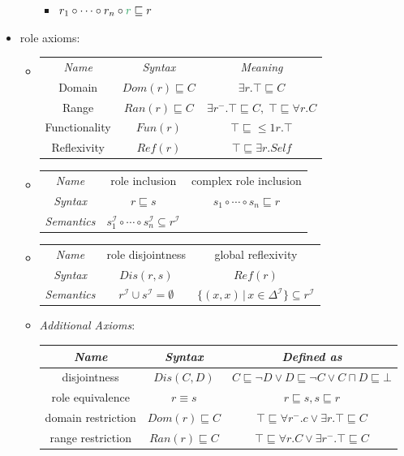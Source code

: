 \documentclass[12pt,a4paper]{article}
\newcommand{\green}[1]{\textcolor{ForestGreen} {#1}}
\newcommand{\ip}{^\mathcal{I}}
\newcommand{\sse}{\sqsubseteq}
\newcommand{\sand}{\sqcap}
\begin{document}
\begin{itemize}
\begin{itemize}
\begin{itemize}
\item $r_1\circ\cdots\circ r_n \circ \green{r}\sse r$
\end{itemize}
\end{itemize}
\item role axioms:
\begin{itemize}
\item \begin{tabular}{c c c}
\textit{Name} & \textit{Syntax} & \textit{Meaning}\\
Domain & $Dom(r) \sse C $ & $\exists r.\top \sse C$\\
Range & $Ran(r) \sse C$ & $\exists r^- .\top \sse C, \; \top \sse \forall r.C$\\
Functionality & $Fun(r)$ & $\top \sse \leq 1 r.\top$\\
Reflexivity & $Ref(r)$ & $\top \sse \exists r.Self$\\
\hline
\end{tabular}
\item \begin{tabular}{c c c}
\textit{Name} & role inclusion & complex role inclusion\\
\textit{Syntax} & $r\sse s$ & $s_1 \circ\cdots\circ s_n\sse r$\\
\textit{Semantics} & $s_1\ip\circ\cdots\circ s_n\ip \subseteq r\ip$\\
\hline
\end{tabular}
\item \begin{tabular}{c c c}
\textit{Name} & role disjointness & global reflexivity\\
\textit{Syntax} & $Dis(r,s)$ & $Ref(r)$\\
\textit{Semantics} & $r\ip \cup s\ip = \emptyset$ & $\{(x,x) \,|\, x\in \Delta\ip\}\subseteq r\ip$
\end{tabular}
\item \textit{Additional Axioms}:\\
\begin{tabular}{c c c}
\textit{Name} & \textit{Syntax} &\textit{Defined as}\\
\hline
disjointness & $Dis(C,D)$ & $C\sse \neg D\lor D\sse \neg C \lor C\sand D \sse \bot$\\
role equivalence & $r\equiv s$ & $r\sse s, s\sse r$\\
domain restriction & $Dom(r) \sse C$ & $\top\sse\forall r^- .c \lor \exists r.\top \sse C$\\
range restriction & $Ran(r) \sse C$ & $\top \sse \forall r.C \lor \exists r^-.\top \sse C$\\

\end{tabular}
\end{itemize}
\end{itemize}
\end{document}
